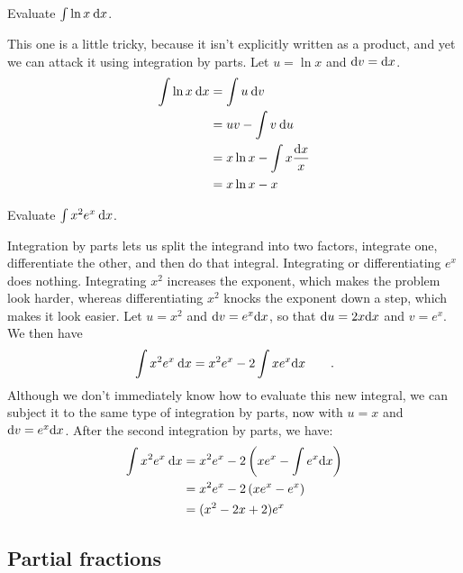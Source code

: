 \begin{eg}
\egquestion Evaluate $\int \ln x \:\textup{d} x$.

\eganswer This one is a little tricky, because it isn't explicitly
written as a product, and yet we can attack it using integration by
parts. Let $u=\ln x$ and $\textup{d} v=\textup{d} x$.
\begin{align*}
  \int \ln x \:\textup{d} x &= \int u \:\textup{d} v \\
                       &= uv - \int v \:\textup{d} u \\
                       &= x\ln x-\int x \frac{\textup{d} x}{x} \\
                       &= x\ln x-x
\end{align*}
\end{eg}

\begin{eg}\label{eg:integrate-x-squared-times-exp}
\egquestion Evaluate $\int x^2 e^x \:\textup{d} x$.

\eganswer
Integration by parts lets us split the integrand into two factors, integrate one, differentiate the
other, and then do that integral. Integrating or differentiating $e^x$ does nothing. Integrating
$x^2$ increases the exponent, which makes the problem look harder, whereas differentiating $x^2$
knocks the exponent down a step, which makes it look easier. Let $u=x^2$ and $\textup{d} v=e^x \textup{d} x$,
so that $\textup{d} u=2x\textup{d} x$ and $v=e^x$. We then have
\begin{equation*}
  \int x^2 e^x \:\textup{d} x = x^2 e^x - 2 \int x e^x\textup{d} x \qquad .
\end{equation*}
Although we don't immediately know how to evaluate this new integral, we can subject it to the
same type of integration by parts, now with $u=x$ and $\textup{d} v=e^x \textup{d} x$. After the second
integration by parts, we have:
\begin{align*}
  \int x^2 e^x \:\textup{d} x &= x^2 e^x - 2 \left(x e^x -\int e^x\textup{d} x \right) \\
                        &= x^2 e^x - 2 \left(x e^x - e^x \right) \\
                        &= (x^2-2x+2)e^x \\
\end{align*}
\end{eg}

\subsection{Partial fractions}

